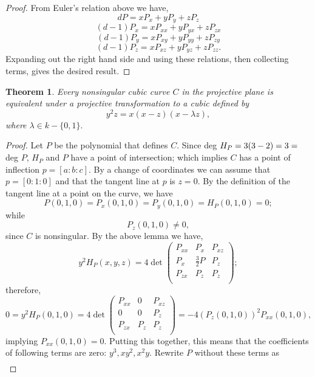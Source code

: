 \documentclass{article}
\newtheorem{theorem}{Theorem}
\theoremstyle{remark}
\begin{document}
\begin{proof}
From Euler's relation above we have,
\[ dP=xP_x+ yP_y+zP_z\]
\[ (d-1)P_x=xP_{xx}+ yP_{yx}+zP_{zx}\]
\[ (d-1)P_y=xP_{xy}+ yP_{yy}+zP_{zy}\]
\[ (d-1)P_z=xP_{xz}+ yP_{yz}+zP_{zz}.\]
Expanding out the right hand side and using these relations, then collecting terms, gives the desired result.
\end{proof}
\begin{theorem}
Every nonsingular cubic curve $C$ in the projective plane is equivalent under a projective transformation to a cubic defined by
\[y^2 z=x(x-z)(x-\lambda z),\]
where $\lambda\in k-\{0,1\}. $
\end{theorem}
\begin{proof}
Let $P$ be the polynomial that defines $C$. Since deg $H_P=3(3-2)=3\\ =$ deg $P$, $H_P$ and $P$ have a point of intersection; which implies $C$ has a point of inflection $p=[a:b:c]$. By a change of coordinates we can assume that $p=[0:1:0]$ and that the tangent line at $p$ is $z=0$. By the definition of the tangent line at a point on the curve, we have
\[P(0,1,0)=P_x (0,1,0)=P_y(0,1,0)=H_P (0,1,0)=0;\]
while
\[P_z(0,1,0)\neq 0,\]
since $C$ is nonsingular. By the above lemma we have,
\[ y^2 H_P(x,y,z)=4 \det 
\begin{pmatrix}
  P_{xx}                      &     P_{x}                  & P_{xz}                       \\
   P_{x}                     &  \frac{3}{2}P           & P_{z}                        \\
   P_{zx}                     &     P_{z}                  & P_{z}                        \\
 \end{pmatrix};\]
 therefore, 
 \[ 0=y^2 H_P(0,1,0)=4 \det 
\begin{pmatrix}
  P_{xx}                      &     0                         & P_{xz}                       \\
            0                      &  0                            & P_{z}                        \\
   P_{zx}                     &     P_{z}                  & P_{z}                        \\
 \end{pmatrix}=-4(P_z(0,1,0))^2 P_{xx}(0,1,0),\]
 implying $P_{xx} (0,1,0)=0$. Putting this together, this means that the coefficients of following terms are zero: $y^3,xy^2,x^2y.$ Rewrite $P$ without these terms as 
 \begin{align*} 

\end{align*}
\end{proof}
\end{document}
